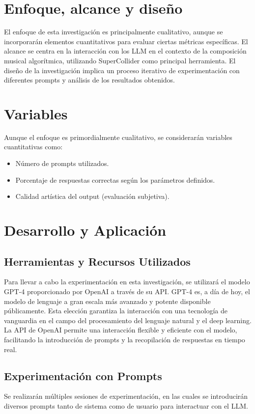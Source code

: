 \section{Enfoque, alcance y diseño}
El enfoque de esta investigación es principalmente cualitativo, aunque se incorporarán elementos cuantitativos para evaluar ciertas métricas específicas. El alcance se centra en la interacción con los LLM en el contexto de la composición musical algorítmica, utilizando SuperCollider como principal herramienta. El diseño de la investigación implica un proceso iterativo de experimentación con diferentes prompts y análisis de los resultados obtenidos.

\section{Variables}
Aunque el enfoque es primordialmente cualitativo, se considerarán variables cuantitativas como:
\begin{itemize}
    \item Número de prompts utilizados.
    \item Porcentaje de respuestas correctas según los parámetros definidos.
    \item Calidad artística del output (evaluación subjetiva).
\end{itemize}

\section{Desarrollo y Aplicación}

\subsection{Herramientas y Recursos Utilizados}
Para llevar a cabo la experimentación en esta investigación, se utilizará el modelo GPT-4 proporcionado por OpenAI a través de su API. GPT-4 es, a día de hoy, el modelo de lenguaje a gran escala más avanzado y potente disponible públicamente. Esta elección garantiza la interacción con una tecnología de vanguardia en el campo del procesamiento del lenguaje natural y el deep learning. La API de OpenAI permite una interacción flexible y eficiente con el modelo, facilitando la introducción de prompts y la recopilación de respuestas en tiempo real.

\subsection{Experimentación con Prompts}
Se realizarán múltiples sesiones de experimentación, en las cuales se introducirán diversos prompts tanto de sistema como de usuario para interactuar con el LLM.

